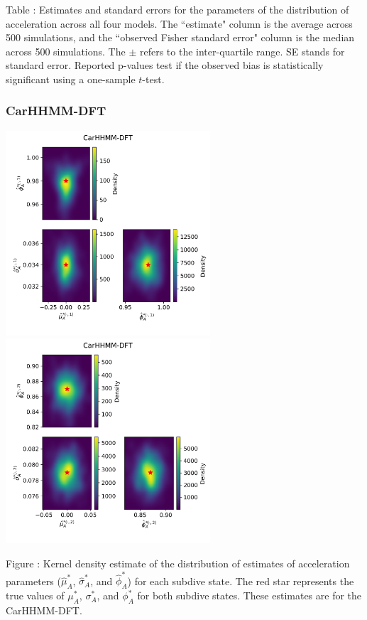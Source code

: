 \documentclass{article}
\begin{document}
        \noindent Table : Estimates and standard errors for the parameters of the distribution of acceleration across all four models. The ``estimate" column is the average across 500 simulations, and the ``observed Fisher standard error" column is the median across 500 simulations. The $\pm$ refers to the inter-quartile range. SE stands for standard error. Reported p-values test if the observed bias is statistically significant using a one-sample $t$-test.
        \addtocounter{tablenum}{1}
    
        \subsubsection{CarHHMM-DFT}
        \begin{center}
        \includegraphics[width=3in]{../Plots/hhmm_FV_MLE_density_A_0_0.png}
        \includegraphics[width=3in]{../Plots/hhmm_FV_MLE_density_A_0_1.png}
        \end{center}
        
        \noindent Figure : Kernel density estimate of the distribution of estimates of acceleration parameters ($\hat \mu^*_A$, $\hat \sigma^*_A$, and $\hat \phi^*_A$) for each subdive state. The red star represents the true values of $\mu^*_A$, $\sigma^*_A$, and $\phi^*_A$ for both subdive states. These estimates are for the CarHHMM-DFT.
        \addtocounter{fignum}{1}
        
\end{document}
